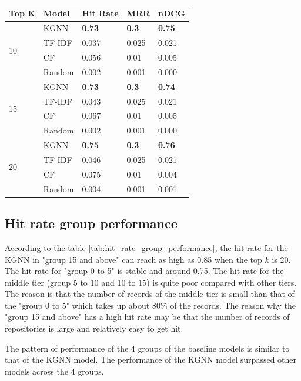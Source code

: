 \documentclass[11pt,twoside]{report}
\begin{document}
\begin{center}
    \begin{tabular}{l | l | l | l | l}
    \hline
    Top K & Model & Hit Rate & MRR & nDCG \\
    \hline
    \multirow{4}{*}{10} 
    & KGNN & \textbf{0.73} & \textbf{0.3} & \textbf{0.75} \\
    & TF-IDF & 0.037 & 0.025 & 0.021 \\
    & CF & 0.056 & 0.01 & 0.005 \\
    & Random & 0.002 & 0.001 & 0.000 \\
    \hline
    \multirow{4}{*}{15}
    & KGNN & \textbf{0.73} & \textbf{0.3} & \textbf{0.74} \\
    & TF-IDF & 0.043 & 0.025 & 0.021 \\
    & CF & 0.067 & 0.01 & 0.005 \\
    & Random & 0.002 & 0.001 & 0.000 \\
    \hline
    \multirow{4}{*}{20}
    & KGNN & \textbf{0.75} & \textbf{0.3} & \textbf{0.76} \\
    & TF-IDF & 0.046 & 0.025 & 0.021 \\
    & CF & 0.075 & 0.01 & 0.004 \\
    & Random & 0.004 & 0.001 & 0.001 \\
    \end{tabular}
    \label{tab:overall_performance}
\end{center}

\subsection{Hit rate group performance}
According to the table \ref{tab:hit_rate_group_performance}, the hit rate for the KGNN in "group 15 and above" can reach as high as 0.85 when the top $k$ is 20. The hit rate for "group 0 to 5" is stable and around 0.75. The hit rate for the middle tier (group 5 to 10 and 10 to 15) is quite poor compared with other tiers. The reason is that the number of records of the middle tier is small than that of the "group 0 to 5" which takes up about 80\% of the records. The reason why the "group 15 and above" has a high hit rate may be that the number of records of repositories is large and relatively easy to get hit.

The pattern of performance of the 4 groups of the baseline models is similar to that of the KGNN model. The performance of the KGNN model surpassed other models across the 4 groups.
\end{document}

